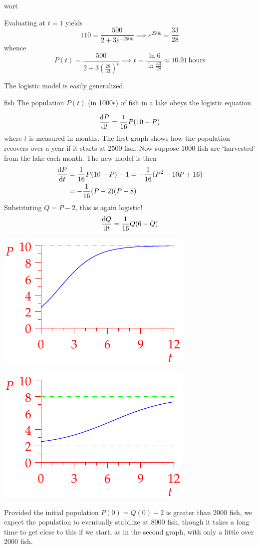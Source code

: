 \begin{example}{}{wort}
\begin{enumeratea}
		Evaluating at $t=1$ yields
		\[
			110=\frac{500}{2+3e^{-250k}} \implies e^{250k}=\frac{33}{28}
		\]
		whence
		\[
			P(t)=\frac{500}{2+3\left(\frac{28}{33}\right)^t}
			\implies t=\frac{\ln 6}{\ln\frac{33}{28}} \approx 10.91\,\text{hours}
		\]
  \end{enumeratea}
\end{example}


The logistic model is easily generalized.

\begin{example}{}{fish}
	The population $P(t)$ (in 1000s) of fish in a lake obeys the logistic equation
	\begin{minipage}[t]{0.6\linewidth}\vspace{-10pt}
		\[
			\diff[P]{t}=\frac 1{16}P(10-P)
		\]
		where $t$ is measured in months. The first graph shows how the population recovers over a year if it starts at 2500 fish.\smallbreak
		Now suppose 1000 fish are `harvested' from the lake each month. The new model is then
		\begin{align*}
			\diff[P]{t}&=\frac 1{16}P(10-P)-1=-\frac 1{16}(P^2-10P+16)\\
			&=-\frac 1{16}(P-2)(P-8)
		\end{align*}
		Substituting $Q=P-2$, this is again logistic!
		\[
			\diff[Q]{t}=\frac 1{16}Q(6-Q)
		\]
	\end{minipage}
	\hfill
	\begin{minipage}[t]{0.39\linewidth}\vspace{0pt}
		\flushright\includegraphics{fish}\par
		\includegraphics{fish2}
	\end{minipage}
	Provided the initial population $P(0)=Q(0)+2$ is greater than 2000 fish, we expect the population to eventually stabilize at 8000 fish, though it takes a long time to get close to this if we start, as in the second graph, with only a little over 2000 fish.
\end{example}
